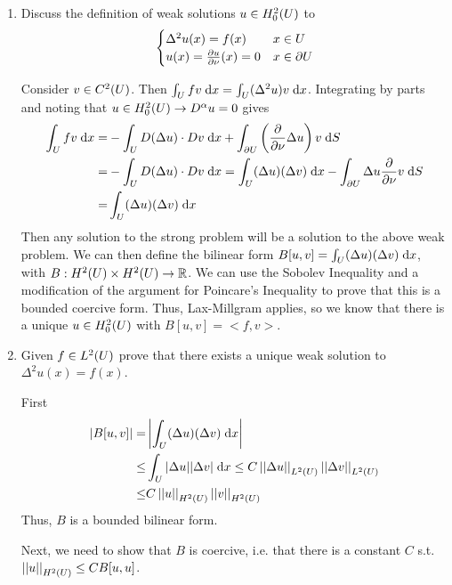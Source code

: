 \begin{enumerate}
\item Discuss the definition of weak solutions $u \in H_0^2(U)$ to
  $$
  \begin{cases}
    \Delta^2 u(x) = f(x) & x \in U\\
    u(x) = \frac{\partial u}{\partial \nu}(x) = 0 & x \in \partial U
  \end{cases}
  $$

  Consider $v \in C^2(U)$. Then $\int_{U} f v \;\mathrm{d}x = \int_{U} (\Delta^2 u) v \;\mathrm{d}x$.
  Integrating by parts and noting that $u \in H_0^2(U) \rightarrow D^{\alpha} u = 0$ gives
  \begin{align*}
    \int_{U} f v \;\mathrm{d}x = &-\int_{U} D(\Delta u) \cdot D v \;\mathrm{d}x
                             + \int_{\partial U} \left(\frac{\partial }{\partial \nu} \Delta u\right) v \;\mathrm{d}S\\
                          = &-\int_{U} D(\Delta u) \cdot D v \;\mathrm{d}x
                          = \int_{U} (\Delta u) (\Delta v) \;\mathrm{d}x
                            - \int_{\partial U} \Delta u \frac{\partial }{\partial \nu} v \;\mathrm{d}S\\
                          = &\int_{U} (\Delta u) (\Delta v) \;\mathrm{d}x
  \end{align*}
  Then any solution to the strong problem will be a solution to the above weak problem.
  We can then define the bilinear form $B[u, v] = \int_{U} (\Delta u) (\Delta  v) \;\mathrm{d}x$,
  with $B: H^2(U) \times H^2(U) \rightarrow \mathbb{R}$.
  We can use the Sobolev Inequality and a modification of the argument for Poincare's Inequality
  to prove that this is a bounded coercive form.
  Thus, Lax-Millgram applies, so we know that there is a unique $u \in H_0^2(U)$ with $B[u, v] = <f, v>$.

\item Given $f \in L^2(U)$ prove that there exists a unique weak solution to $\Delta^2 u(x) = f(x)$.

  First
  \begin{align*}
    |B[u, v]| = &\left| \int_{U} (\Delta u) (\Delta v) \;\mathrm{d}x \right|\\
           \leq &\int_{U} |\Delta u| |\Delta v| \;\mathrm{d}x
           \leq C \left|\left|\Delta u\right|\right|_{L^{2}(U)} \left|\left|\Delta v\right|\right|_{L^{2}(U)}\\
           \leq &C \left|\left|u\right|\right|_{H^{2}(U)} \left|\left|v\right|\right|_{H^{2}(U)}
  \end{align*}
  Thus, $B$ is a bounded bilinear form.

  Next, we need to show that $B$ is coercive, i.e. that there is a constant $C$ s.t.
  $\left|\left|u\right|\right|_{H^{2}(U)} \leq C B[u, u]$.


\end{enumerate}
